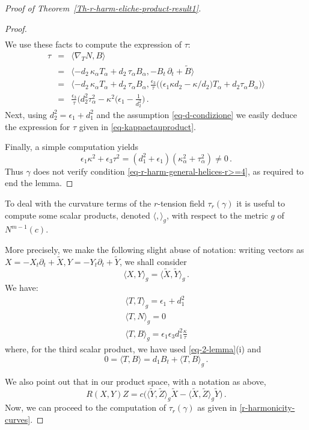 \documentclass[11pt]{amsart}
\theoremstyle{plain}
\theoremstyle{definition}
\numberwithin{equation}{section}
\begin{document}
\begin{proof}[Proof of Theorem~\ref{Th-r-harm-eliche-product-result1}]
\begin{proof}
\begin{equation}
\begin{array}{ll}
\end{array}
\end{equation}
We use these facts to compute the expression of $\tau$:
\begin{eqnarray}\nonumber
\tau&=& \langle \nabla_T N,B \rangle \\\nonumber
&=&\langle -d_2\, \kappa_\alpha T_\alpha + d_2\, \tau_\alpha B_\alpha,-B_t \,\partial_t + \widetilde{B} \rangle\\
&=&\langle -d_2\, \kappa_\alpha T_\alpha + d_2\, \tau_\alpha B_\alpha,\frac{\epsilon_3}{\tau} \Big (\big (\epsilon_1 \kappa d_2-\kappa/d_2 \big )T_\alpha + d_2 \tau_\alpha B_\alpha\Big )\rangle\\\nonumber
&=&\frac{\epsilon_3}{\tau} \Big (d_2^2 \tau^2_\alpha -\kappa^2(\epsilon_1-\frac{1}{d_2^2} \Big )\,.
\end{eqnarray}
Next, using $d_2^2=\epsilon_1+d_1^2$ and the assumption \eqref{eq-d-condizione} we easily deduce the expression for $\tau$ given in \eqref{eq-kappaetauproduct}.

Finally, a simple computation yields
\[
\epsilon_1 \kappa^2 +\epsilon_3 \tau^2 =\left(d_1^2+\epsilon_1 \right)\left(\kappa^2_\alpha +\tau^2_\alpha \right )\neq 0\,.
\]
Thus $\gamma$ does not verify condition \eqref{eq-r-harm-general-helices-r>=4}, as required to end the lemma.
\end{proof}
To deal with the curvature terms of the $r$-tension field $\tau_r(\gamma)$ it is useful to compute some scalar products, denoted $\langle,\rangle_g$, with respect to the metric $g$ of $N^{m-1}(c)$. 

More precisely, we make the following slight abuse of notation: writing vectors as $X=-X_t\partial_t+\widetilde{X},Y=-Y_t\partial_t+\widetilde{Y}$, we shall consider
\[
\langle X, Y\rangle_g=\langle \widetilde{X}, \widetilde{Y}\rangle_g \,.
\]We have:
\begin{equation}\label{eq3}
\begin{array}{l}
\langle T, T\rangle_g =\epsilon_1+d_1^2\\
\langle T, N \rangle_g=0\\
\langle T, B\rangle_g =\epsilon_1 \epsilon_3 d_1^2 \frac{\kappa}{\tau}
\end{array}
\end{equation}
where, for the third scalar product, we have used \eqref{eq-2-lemma}(i) and 
\[
0=\langle T, B\rangle=d_1 B_t+\langle T, B\rangle_g \,.
\]

We also point out that in our product space, with a notation as above,
\[
R(X,Y)Z=c \Big (\langle \widetilde{Y}, \widetilde{Z}\rangle_g \widetilde{X}-\langle \widetilde{X}, \widetilde{Z}\rangle_g \widetilde{Y}\Big )\,.
\]
Now, we can proceed to the computation of $\tau_r(\gamma)$ as given in \eqref{r-harmonicity-curves}. 


\end{proof}
\end{document}
